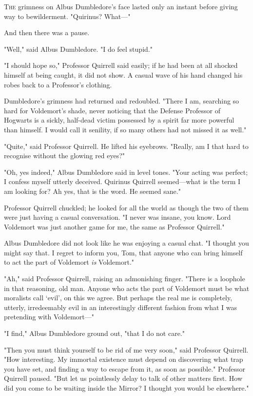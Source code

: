 
\label{ch-ReflectionsII}

\lettrine{T}{he} grimness on Albus Dumbledore's face lasted only an instant before giving
way to bewilderment. "Quirinus? What---"

And then there was a pause.

"Well," said Albus Dumbledore. "I do feel stupid."

"I should hope so," Professor Quirrell said easily; if he had been at all
shocked himself at being caught, it did not show. A casual wave of his hand
changed his robes back to a Professor's clothing.

Dumbledore's grimness had returned and redoubled. "There I am, searching so
hard for Voldemort's shade, never noticing that the Defense Professor of
Hogwarts is a sickly, half-dead victim possessed by a spirit far more powerful
than himself. I would call it senility, if so many others had not missed it as
well."

"Quite," said Professor Quirrell. He lifted his eyebrows. "Really, am I that
hard to recognise without the glowing red eyes?"

"Oh, yes indeed," Albus Dumbledore said in level tones. "Your acting was
perfect; I confess myself utterly deceived. Quirinus Quirrell seemed---what is
the term I am looking for? Ah yes, that is the word. He seemed sane."

Professor Quirrell chuckled; he looked for all the world as though the two of
them were just having a casual conversation. "I never was insane, you know.
Lord Voldemort was just another game for me, the same as Professor Quirrell."

Albus Dumbledore did not look like he was enjoying a casual chat. "I thought
you might say that. I regret to inform you, Tom, that anyone who can bring
himself to act the part of Voldemort \emph{is} Voldemort."

"Ah," said Professor Quirrell, raising an admonishing finger. "There is a
loophole in that reasoning, old man. Anyone who acts the part of Voldemort must
be what moralists call `evil', on this we agree. But perhaps the real me is
completely, utterly, irredeemably evil in an interestingly different fashion
from what I was pretending with Voldemort---"

"I find," Albus Dumbledore ground out, "that I do not care."

"Then you must think yourself to be rid of me very soon," said Professor
Quirrell. "How interesting. My immortal existence must depend on discovering
what trap you have set, and finding a way to escape from it, as soon as
possible." Professor Quirrell paused. "But let us pointlessly delay to talk of
other matters first. How did you come to be waiting inside the Mirror? I
thought you would be elsewhere."

